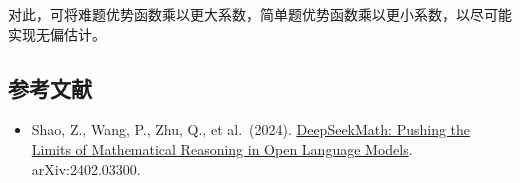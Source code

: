 对此，可将难题优势函数乘以更大系数，简单题优势函数乘以更小系数，以尽可能实现无偏估计。

\FloatBarrier
{}
\hypertarget{ux53c2ux8003ux6587ux732e-85}{%
\subsection{参考文献}\label{ux53c2ux8003ux6587ux732e-85}}

\vspace{0.25em}
\begin{itemize}
\tightlist
\item
  Shao, Z., Wang, P., Zhu, Q., et al.~(2024). \href{https://arxiv.org/abs/2402.03300}{DeepSeekMath: Pushing the Limits of Mathematical Reasoning in Open Language Models}. arXiv:2402.03300.
\end{itemize}

\clearpage

